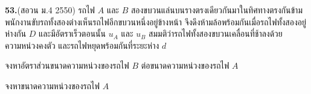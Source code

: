 \par\noindent\textbf{53.}\quad (สอวน ม.4 2550) รถไฟ $A$ และ $B$ สองขบวนแล่นบนรางตรงเดียวกันมาในทิศทางตรงกันข้าม พนักงานขับรถทั้งสองต่างเห็นรถไฟอีกขบวนหนึ่งอยู่ข้างหน้า จึงดึงห้ามล้อพร้อมกันเมื่อรถไฟทั้งสองอยู่ห่างกัน $D$ และมีอัตราเร็วตอนนั้น $u_A$ และ $u_B$ สมมติว่ารถไฟทั้งสองขบวนเคลื่อนที่ช้าลงด้วยความหน่วงคงตัว และรถไฟหยุดพร้อมกันที่ระยะห่าง $d$

\par{}\quad จงหาอัตราส่วนขนาดความหน่วงของรถไฟ $B$ ต่อขนาดความหน่วงของรถไฟ $A$

\par{}\quad จงหาขนาดความหน่วงของรถไฟ $A$\par\medskip
